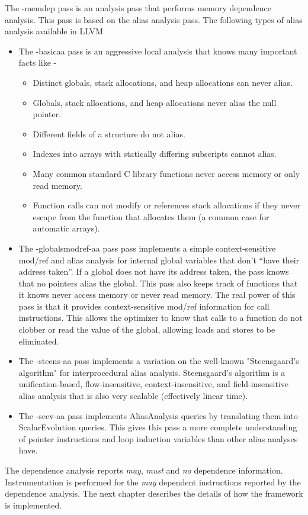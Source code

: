 \documentclass[10pt]{report}          %
\begin{document}
\begin{enumerate}
The -memdep pass is an analysis pass that performs memory dependence analysis.  This pass is based on the alias analysis pass.  The following types of alias analysis available in LLVM

\begin{itemize}

\item The -basicaa pass is an aggressive local analysis that knows many important facts like -

\begin{itemize}
\item Distinct globals, stack allocations, and heap allocations can never alias.
\item Globals, stack allocations, and heap allocations never alias the null pointer.
\item Different fields of a structure do not alias.
\item Indexes into arrays with statically differing subscripts cannot alias.
\item Many common standard C library functions never access memory or only read memory.
\item Function calls can not modify or references stack allocations if they never escape from the function that allocates them (a common case for automatic arrays).
\end{itemize}

\item The -globalsmodref-aa pass pass implements a simple context-sensitive mod/ref and alias analysis for internal global variables that don’t “have their address taken”. If a global does not have its address taken, the pass knows that no pointers alias the global. This pass also keeps track of functions that it knows never access memory or never read memory. The real power of this pass is that it provides context-sensitive mod/ref information for call instructions. This allows the optimizer to know that calls to a function do not clobber or read the value of the global, allowing loads and stores to be eliminated.

\item The -steens-aa pass implements a variation on the well-known "Steensgaard’s algorithm" for interprocedural alias analysis. Steensgaard’s algorithm is a unification-based, flow-insensitive, context-insensitive, and field-insensitive alias analysis that is also very scalable (effectively linear time). 

\item The -scev-aa pass implements AliasAnalysis queries by translating them into ScalarEvolution queries. This gives this pass a more complete understanding of pointer instructions and loop induction variables than other alias analyses have.

\end{itemize}

The dependence analysis reports \textit{may}, \textit{must} and \textit{no} dependence information.  Instrumentation is performed for the \textit{may} dependent instructions reported by the dependence analysis.  The next chapter describes the details of how the framework is implemented.

\end{enumerate}
\end{document}
